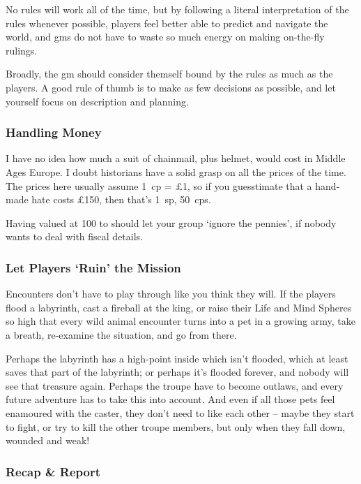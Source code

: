 \begin{multicols}{2}
No rules will work all of the time, but by following a literal interpretation of the rules whenever possible, players feel better able to predict and navigate the world, and \glspl{gm} do not have to waste so much energy on making on-the-fly rulings.

Broadly, the \gls{gm} should consider themself bound by the rules as much as the players.
A good rule of thumb is to make as few decisions as possible, and let yourself focus on description and planning.

\subsubsection{Handling Money}
I have no idea how much a suit of chainmail, plus helmet, would cost in Middle Ages Europe.
I doubt historians have a solid grasp on all the prices of the time.
The prices here usually assume 1~\gls{cp} = \pounds1, so if you guesstimate that a hand-made hate costs \pounds150, then that's 1~\gls{sp}, 50~\glspl{cp}.

Having  valued at 100 to  should let your group `ignore the pennies', if nobody wants to deal with fiscal details.

\subsubsection{Let Players `Ruin' the Mission}

Encounters don't have to play through like you think they will.
If the players flood a labyrinth, cast a fireball at the king, or raise their Life and Mind Spheres so high that every wild animal encounter turns into a pet in a growing army, take a breath, re-examine the situation, and go from there.

Perhaps the labyrinth has a high-point inside which isn't flooded, which at least saves that part of the labyrinth; or perhaps it's flooded forever, and nobody will see that treasure again.
Perhaps the troupe have to become outlaws, and every future adventure has to take this into account.
And even if all those pets feel enamoured with the caster, they don't need to like each other -- maybe they start to fight, or try to kill the other troupe members, but only when they fall down, wounded and weak!

\subsubsection{Recap \& Report}


\end{multicols}
